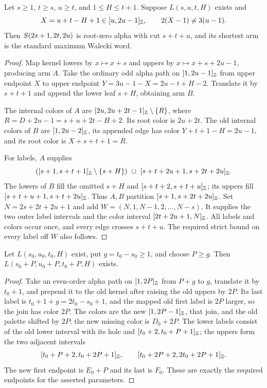 \begin{lemma}\label{mc:lower-completion}
Let $s\ge1$, $t\ge s$, $u\ge t$, and $1\le H\le t+1$.
Suppose $L(s,u,t,H)$ exists and
\[
 X=u+t-H+1\in[u,2u-1]_{\mathbb Z},\qquad
 2(X-1)\ne3(u-1).
\]
Then $S\!\left(2s+1,2t,2u\right)$ is root-zero alpha with cut $s+t+u$,
and its shortest arm is the standard maximum Walecki word.
\end{lemma}
\begin{proof}
Map kernel lowers by $x\mapsto x+s$ and uppers by
$x\mapsto x+s+2u-1$, producing arm $A$.
Take the ordinary odd alpha path on $[1,2u-1]_{\mathbb Z}$
from upper endpoint $X$ to upper endpoint
$Y=3u-1-X=2u-t+H-2$.  Translate it by $s+t+1$ and append
the lower leaf $s+H$, obtaining arm $B$.

The internal colors of $A$ are
$[2u,2u+2t-1]_{\mathbb Z}\setminus\{R\}$, where
$R=D+2u-1=s+u+2t-H+2$.  Its root color is $2u+2t$.
The old internal colors of $B$ are $[1,2u-2]_{\mathbb Z}$,
its appended edge has color $Y+t+1-H=2u-1$, and its root color
is $X+s+t+1=R$.

For labels, $A$ supplies
\[
 ([s+1,s+t+1]_{\mathbb Z}\setminus\{s+H\})
 \ \cup\ [s+t+2u+1,s+2t+2u]_{\mathbb Z}.
\]
The lowers of $B$ fill the omitted $s+H$ and
$[s+t+2,s+t+u]_{\mathbb Z}$; its uppers fill
$[s+t+u+1,s+t+2u]_{\mathbb Z}$.
Thus $A,B$ partition $[s+1,s+2t+2u]_{\mathbb Z}$.
Set $N=2s+2t+2u+1$ and add
$W=(N,1,N-1,2,\ldots,N-s)$.  It supplies the two outer label
intervals and the color interval $[2t+2u+1,N]_{\mathbb Z}$.
All labels and colors occur once, and every edge crosses $s+t+u$.
The required strict bound on every label off $W$ also follows.
\end{proof}

\begin{lemma}
\label{mc:lower-growth}
Let $L(s_0,u_0,t_0,H)$ exist, put $g=t_0-s_0\ge1$, and
choose $P\ge g$.  Then $L(s_0+P,u_0+P,t_0+P,H)$ exists.
\end{lemma}
\begin{proof}
Take an even-order alpha path on $[1,2P]_{\mathbb Z}$ from $P+g$
to $g$, translate it by $t_0+1$, and prepend it to the old kernel
after raising the old uppers by $2P$.
Its last label is $t_0+1+g=2t_0-s_0+1$, and the mapped old
first label is $2P$ larger, so the join has color $2P$.
The colors are the new $[1,2P-1]_{\mathbb Z}$, that join, and
the old palette shifted by $2P$; the new missing color is $D_0+2P$.
The lower labels consist of the old lower interval with its hole
and $[t_0+2,t_0+P+1]_{\mathbb Z}$; the uppers form the two
adjacent intervals
\[
 [t_0+P+2,t_0+2P+1]_{\mathbb Z},\qquad
 [t_0+2P+2,2t_0+2P+1]_{\mathbb Z}.
\]
The new first endpoint is $E_0+P$ and its last is $F_0$.
These are exactly the required endpoints for the asserted parameters.
\end{proof}

